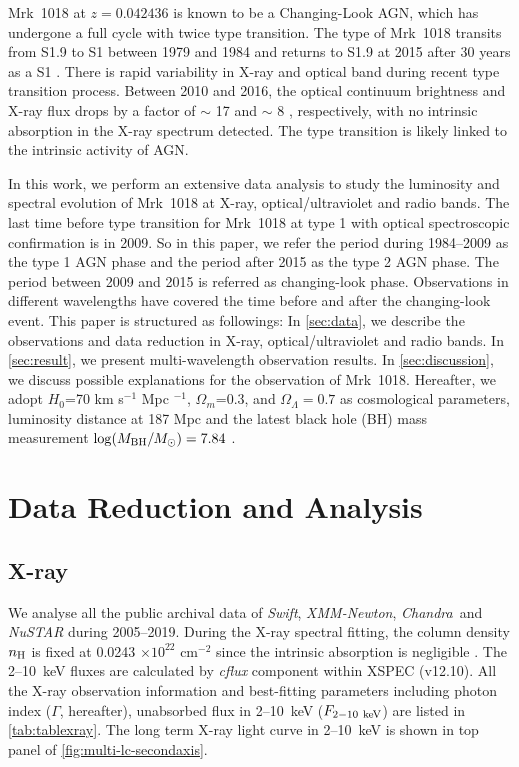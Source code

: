 \documentclass[twocolumn]{aastex63}
\newcommand{\xmm}{{\em XMM-Newton}}
\newcommand{\nustar}{{\em NuSTAR }}
\newcommand{\chandra}{{\em Chandra}}
\newcommand{\swift}{{\small \it Swift}}
\begin{document}
Mrk~1018 at $z=0.042436$ is known to be a Changing-Look AGN, which has undergone a full cycle with twice type transition. The type of Mrk~1018 transits from S1.9 to S1 between 1979 and 1984 \citep{1986ApJ...311..135C} and returns to S1.9 at 2015 after 30 years as a S1 \citep[see also][]{2016A&A...593L...8M,2016A&A...593L...9H,2017A&A...607L...9K}. There is rapid variability in X-ray and optical band during recent type transition process. Between 2010 and 2016, the optical continuum brightness and X-ray flux drops by a factor of $\sim$ 17 and $\sim$ 8 \citep{2016A&A...593L...9H}, respectively, with no intrinsic absorption in the X-ray spectrum detected. The type transition is likely linked to the intrinsic activity of AGN.

In this work, we perform an extensive data analysis to study the luminosity and spectral evolution of Mrk~1018 at X-ray, optical/ultraviolet and radio bands. The last time before type transition for Mrk~1018 at type 1 with optical spectroscopic confirmation is in 2009. So in this paper, we refer the period during 1984--2009 as the type 1 AGN phase and the period after 2015 as the type 2 AGN phase. The period between 2009 and 2015 is referred as changing-look phase. Observations in different wavelengths have covered the time before and after the changing-look event. This paper is structured as followings: In \autoref{sec:data}, we describe the observations and data reduction in X-ray, optical/ultraviolet and radio bands. In \autoref{sec:result}, we present multi-wavelength observation results. In \autoref{sec:discussion}, we discuss possible explanations for the observation of Mrk~1018. Hereafter, we adopt $H_0$=70 km s$^{-1}$ Mpc $^{-1}$, $\Omega_{m}$=0.3, and $\Omega_{\Lambda}=0.7 $ as cosmological parameters, luminosity distance at 187 Mpc and the latest black hole (BH) mass measurement $\log(M_{\rm{BH}}/M_{\odot})=7.84$ \citep{2017MNRAS.472.3492E,2018MNRAS.480.3898N}. 


\section{Data Reduction and Analysis}\label{sec:data}
\subsection{X-ray}
We analyse all the public archival data of \swift, \xmm, \chandra ~and \nustar during 2005--2019. During the X-ray spectral fitting, the column density $n_{\rm{H}}$ is fixed at 0.0243 $\times 10^{22}$ cm$^{-2}$ since the intrinsic absorption is negligible \citep[see ][]{2016A&A...593L...9H}. The 2--10~keV fluxes are calculated by {\it cflux} component within {\scriptsize XSPEC} (v12.10). All the X-ray observation information and best-fitting parameters including photon index ($\Gamma$, hereafter), unabsorbed flux in 2--10~keV ($F_{\rm{2-10~keV}}$) are listed in \autoref{tab:tablexray}. The long term X-ray light curve in 2--10~keV is shown in top panel of \autoref{fig:multi-lc-secondaxis}.
\end{document}
